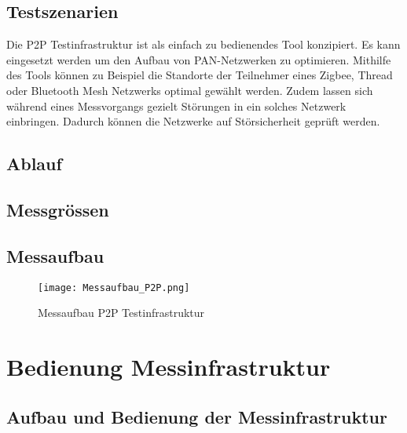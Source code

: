 \subsection{Testszenarien}\label{sec:TestszenarienP2P}

Die P2P Testinfrastruktur ist als einfach zu bedienendes Tool konzipiert. Es kann eingesetzt werden um den Aufbau von PAN-Netzwerken zu optimieren. Mithilfe des Tools können zu Beispiel die Standorte der Teilnehmer eines Zigbee, Thread oder Bluetooth Mesh Netzwerks optimal gewählt werden. Zudem lassen sich während eines Messvorgangs gezielt Störungen in ein solches Netzwerk einbringen. Dadurch können die Netzwerke auf Störsicherheit geprüft werden. 


\subsection{Ablauf}\label{sec:AblaufP2P}

\subsection{Messgrössen}\label{sec:MessgrössenP2P}

\subsection{Messaufbau}\label{sec:Messaufbau}

\begin{figure} [H]
	\centering
	\texttt{[image: Messaufbau\_P2P.png]}
	\caption{Messaufbau P2P Testinfrastruktur}
	\label{fig:MessaufbauP2P}
\end{figure}



\section{Bedienung Messinfrastruktur}\label{sec:BedienungMessinfrastruktur}


\subsection{Aufbau und Bedienung der Messinfrastruktur}\label{sec:AufbauundBedienungderMessinfrastruktur}


